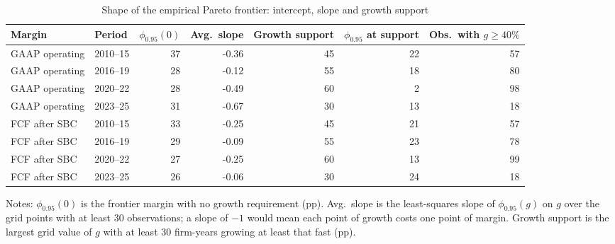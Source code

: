 \begin{table}[t]\centering\small
\caption{Shape of the empirical Pareto frontier: intercept, slope and growth support}\label{tab:envelope}
\begin{tabular}{llrrrrr}\toprule
Margin & Period & $\phi_{0.95}(0)$ & Avg.\ slope & Growth support & $\phi_{0.95}$ at support & Obs.\ with $g\geq 40\%$\\\midrule
GAAP operating & 2010--15 & 37 & -0.36 & 45 & 22 & 57 \\
GAAP operating & 2016--19 & 28 & -0.12 & 55 & 18 & 80 \\
GAAP operating & 2020--22 & 28 & -0.49 & 60 & 2 & 98 \\
GAAP operating & 2023--25 & 31 & -0.67 & 30 & 13 & 18 \\
FCF after SBC & 2010--15 & 33 & -0.25 & 45 & 21 & 57 \\
FCF after SBC & 2016--19 & 29 & -0.09 & 55 & 23 & 78 \\
FCF after SBC & 2020--22 & 27 & -0.25 & 60 & 13 & 99 \\
FCF after SBC & 2023--25 & 26 & -0.06 & 30 & 24 & 18 \\
\bottomrule\end{tabular}
\par\vspace{2pt}\footnotesize\raggedright Notes: $\phi_{0.95}(0)$ is the frontier margin with no growth requirement (pp). Avg.\ slope is the least-squares slope of $\phi_{0.95}(g)$ on $g$ over the grid points with at least 30 observations; a slope of $-1$ would mean each point of growth costs one point of margin. Growth support is the largest grid value of $g$ with at least 30 firm-years growing at least that fast (pp).
\end{table}